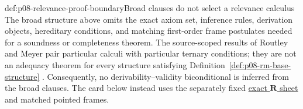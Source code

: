 \begin{proofboundary}{def:p08-relevance-proof-boundary}{Broad clauses do not select a relevance calculus}
The broad structure above omits the exact axiom set, inference rules,
derivation objects, hereditary conditions, and matching first-order frame
postulates needed for a soundness or completeness theorem.  The source-scoped
results of Routley and Meyer pair particular calculi with particular ternary
conditions; they are not an adequacy theorem for every structure satisfying
Definition~\ref{def:p08-rm-base-structure} \cite{RoutleyMeyer1972}.
Consequently, no derivability--validity biconditional is inferred from the
broad clauses.  The card below instead uses the separately fixed
\hyperref[sheet:relevance-r]{exact \(\mathbf R\) sheet} and matched pointed
frames.
\end{proofboundary}

